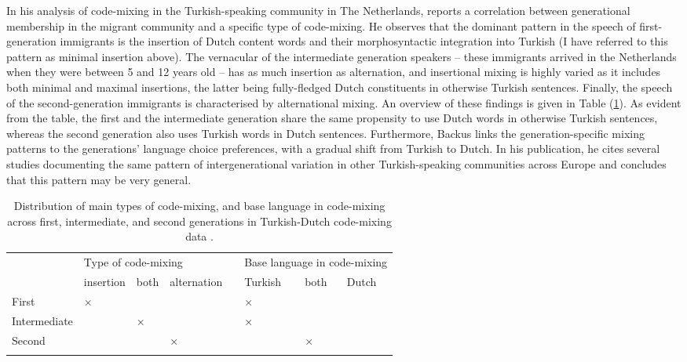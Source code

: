 In his analysis of code-mixing in the Turkish-speaking community in The Netherlands, \citet[][387--391]{backus-two-1996} reports a correlation between generational membership in the migrant community and a specific type of code-mixing. He observes that the dominant pattern in the speech of first-generation immigrants is the insertion of Dutch content words and their morphosyntactic integration into Turkish (I have referred to this pattern as minimal insertion above). The vernacular of the intermediate generation speakers -- these immigrants arrived in the Netherlands when they were between 5 and 12 years old -- has as much insertion as alternation, and insertional mixing is highly varied as it includes both minimal and maximal insertions, the latter being fully-fledged Dutch constituents in otherwise Turkish sentences. Finally, the speech of the second-generation immigrants is characterised by alternational mixing. An overview of these findings is given in Table (\ref{tab:1:1}). As evident from the table, the first and the intermediate generation share the same propensity to use Dutch words in otherwise Turkish sentences, whereas the second generation also uses Turkish words in Dutch sentences. Furthermore, Backus links the generation-specific mixing patterns to the generations' language choice preferences, with a gradual shift from Turkish to Dutch. In his \citeyear[][]{backus06} publication, he cites several studies documenting the same pattern of intergenerational variation in other Turkish-speaking communities across Europe and concludes that this pattern may be very general. 

\begin{table}
\begin{small}
\begin{tabular}{llllllll} 
\midrule
\addlinespace[2mm]
\multirow{2}{*}{Generation}& \multicolumn{3}{l}{Type of code-mixing} & &\multicolumn{3}{l}{Base language in code-mixing}\\
\addlinespace[2mm]
\cmidrule{2-4} \cmidrule{6-8}
\addlinespace[2mm]
& insertion & both & alternation & & Turkish & both & Dutch \\
\addlinespace[2mm]
\midrule
\addlinespace[2mm]
First & × & & & & × & & \\
Intermediate & & × & & & × & & \\
Second & & & × & & & × & \\
\addlinespace[2mm]
\midrule
\end{tabular}
\end{small}
\caption{Distribution of main types of code-mixing, and base language in code-mixing across first, intermediate, and second generations in Turkish-Dutch code-mixing data \citep[adapted from][702]{backus06}.}
\label{tab:1:1}
\end{table}

